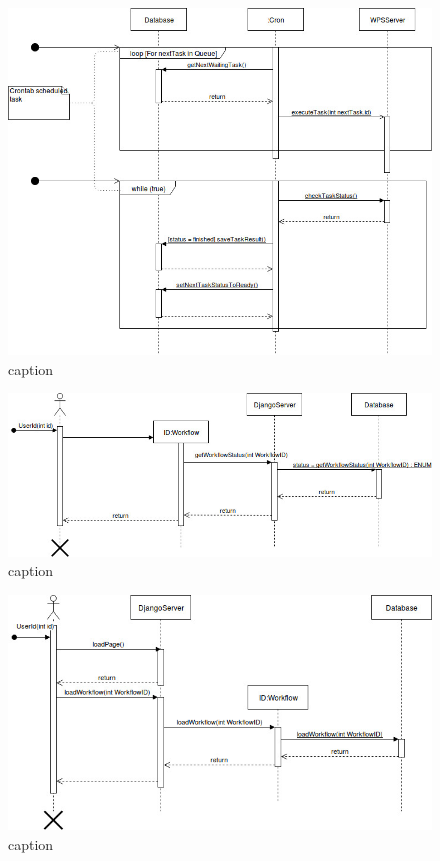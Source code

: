 \begin{itemize}
    \begin{figure}[h]
      \centering
      \includegraphics[width=15cm]{images/sqd_execute_workflow_cron.jpg}
      \caption{caption}
      \label{fig:sqd_exec_cron}
    \end{figure}
    
    \begin{figure}[h]
      \centering
      \includegraphics[width=15cm]{images/sqd_get_workflow_status.jpg}
      \caption{caption}
      \label{fig:sqd_get_wf_status}
    \end{figure}
    
    \begin{figure}[h]
      \centering
      \includegraphics[width=15cm]{images/sqd_load_workflow.jpg}
      \caption{caption}
      \label{fig:sqd_load_wf}
    \end{figure}
    

\end{itemize}
